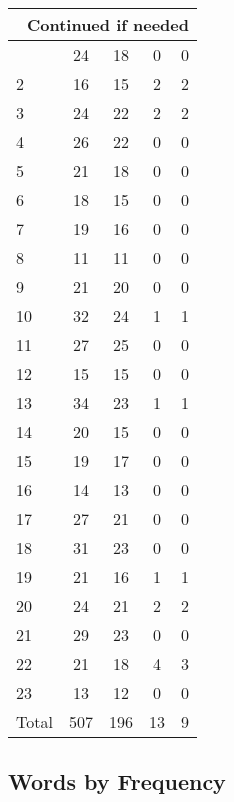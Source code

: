\begin{center}
\begin{longtable}{l|c|c|c|c}
\hline \multicolumn{5}{|r|}{{Continued if needed}} \\ \hline
\endfoot 
1 & 24 & 18 & 0 & 0\\ \hline
2 & 16 & 15 & 2 & 2\\ \hline
3 & 24 & 22 & 2 & 2\\ \hline
4 & 26 & 22 & 0 & 0\\ \hline
5 & 21 & 18 & 0 & 0\\ \hline
6 & 18 & 15 & 0 & 0\\ \hline
7 & 19 & 16 & 0 & 0\\ \hline
8 & 11 & 11 & 0 & 0\\ \hline
9 & 21 & 20 & 0 & 0\\ \hline
10 & 32 & 24 & 1 & 1\\ \hline
11 & 27 & 25 & 0 & 0\\ \hline
12 & 15 & 15 & 0 & 0\\ \hline
13 & 34 & 23 & 1 & 1\\ \hline
14 & 20 & 15 & 0 & 0\\ \hline
15 & 19 & 17 & 0 & 0\\ \hline
16 & 14 & 13 & 0 & 0\\ \hline
17 & 27 & 21 & 0 & 0\\ \hline
18 & 31 & 23 & 0 & 0\\ \hline
19 & 21 & 16 & 1 & 1\\ \hline
20 & 24 & 21 & 2 & 2\\ \hline
21 & 29 & 23 & 0 & 0\\ \hline
22 & 21 & 18 & 4 & 3\\ \hline
23 & 13 & 12 & 0 & 0\\ \hline
\hline \hline
Total & 507 & 196 & 13 & 9




\end{longtable}
\end{center}



\subsection{Words by Frequency}

